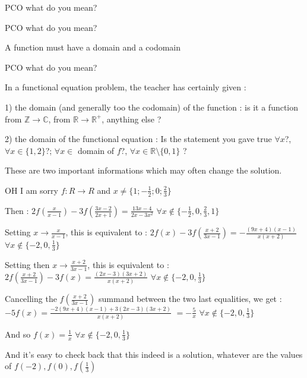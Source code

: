 \begin{solution}
	PCO  what do you mean?
\end{solution}



\begin{solution}
	\begin{tcolorbox}PCO  what do you mean?\end{tcolorbox}
A function must have a domain and a codomain
\end{solution}



\begin{solution}
	\begin{tcolorbox}PCO  what do you mean?\end{tcolorbox}
In a functional equation problem, the teacher has certainly given :

1) the domain (and generally too the codomain) of the function : is it a function from $\mathbb Z\to\mathbb C$, from $\mathbb R\to \mathbb R^+$, anything else ?

2) the domain of the functional equation : Is the statement you gave true $\forall x$?, $\forall x\in\{1,2\}$?; $\forall x\in$ domain of $f$?, $\forall x\in\mathbb R\setminus\{0,1\}$ ?

These are two important informations which may often change the solution.
\end{solution}



\begin{solution}
	OH I am sorry $f:R\longrightarrow R$ and $x\neq \{1;-\frac{1}{2};0;\frac{2}{3}\}$
\end{solution}



\begin{solution}
	Then :
$2f(\frac{x}{x-1})-3f(\frac{3x-2}{2x+1})=\frac{13x-4}{2x-3x^2}$ $\forall x\notin\{-\frac 12,0,\frac 23,1\}$

Setting $x\to\frac x{x-1}$, this is equivalent to :
$2f(x)-3f(\frac{x+2}{3x-1})=-\frac{(9x+4)(x-1)}{x(x+2)}$ $\forall x\notin\{-2,0,\frac 13\}$

Setting then $x\to\frac{x+2}{3x-1}$, this is equivalent to :
$2f(\frac{x+2}{3x-1})-3f(x)=\frac{(2x-3)(3x+2)}{x(x+2)}$ $\forall x\notin\{-2,0,\frac 13\}$

Cancelling the $f(\frac{x+2}{3x-1})$ summand between the two last equalities, we get :
$-5f(x)=\frac{-2(9x+4)(x-1)+3(2x-3)(3x+2)}{x(x+2)}$ $=-\frac 5x$ $\forall x\notin\{-2,0,\frac 13\}$

And so $f(x)=\frac 1x$ $\forall x\notin\{-2,0,\frac 13\}$

And it's easy to check back that this indeed is a solution, whatever are the values of $f(-2),f(0),f(\frac 13)$
\end{solution}



